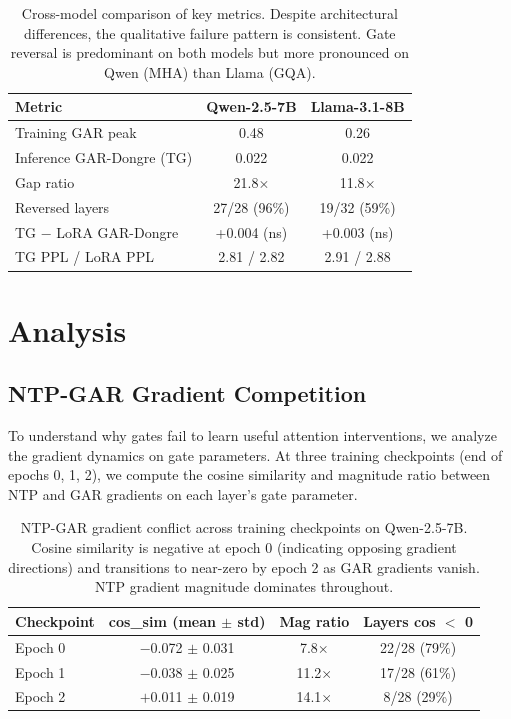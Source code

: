 \documentclass[11pt,a4paper]{article}
\begin{document}
\begin{table}[t]
\centering
\caption{Cross-model comparison of key metrics. Despite architectural differences, the qualitative failure pattern is consistent. Gate reversal is predominant on both models but more pronounced on Qwen (MHA) than Llama (GQA).}
\label{tab:cross_model}
\small
\begin{tabular}{lcc}
\toprule
\textbf{Metric} & \textbf{Qwen-2.5-7B} & \textbf{Llama-3.1-8B} \\
\midrule
Training GAR peak & 0.48 & 0.26 \\
Inference GAR-Dongre (TG) & 0.022 & 0.022 \\
Gap ratio & 21.8$\times$ & 11.8$\times$ \\
Reversed layers & 27/28 (96\%) & 19/32 (59\%) \\
TG $-$ LoRA GAR-Dongre & +0.004 (ns) & +0.003 (ns) \\
TG PPL / LoRA PPL & 2.81 / 2.82 & 2.91 / 2.88 \\
\bottomrule
\end{tabular}
\end{table}

\section{Analysis}

\subsection{NTP-GAR Gradient Competition}

To understand why gates fail to learn useful attention interventions, we analyze the gradient dynamics on gate parameters. At three training checkpoints (end of epochs 0, 1, 2), we compute the cosine similarity and magnitude ratio between NTP and GAR gradients on each layer's gate parameter.

\begin{table}[t]
\centering
\caption{NTP-GAR gradient conflict across training checkpoints on Qwen-2.5-7B. Cosine similarity is negative at epoch 0 (indicating opposing gradient directions) and transitions to near-zero by epoch 2 as GAR gradients vanish. NTP gradient magnitude dominates throughout.}
\label{tab:gradient_qwen}
\small
\begin{tabular}{lccc}
\toprule
\textbf{Checkpoint} & \textbf{cos\_sim (mean $\pm$ std)} & \textbf{Mag ratio} & \textbf{Layers cos $<$ 0} \\
\midrule
Epoch 0 & $-$0.072 $\pm$ 0.031 & 7.8$\times$ & 22/28 (79\%) \\
Epoch 1 & $-$0.038 $\pm$ 0.025 & 11.2$\times$ & 17/28 (61\%) \\
Epoch 2 & $+$0.011 $\pm$ 0.019 & 14.1$\times$ & 8/28 (29\%) \\
\bottomrule
\end{tabular}
\end{table}
\end{document}
